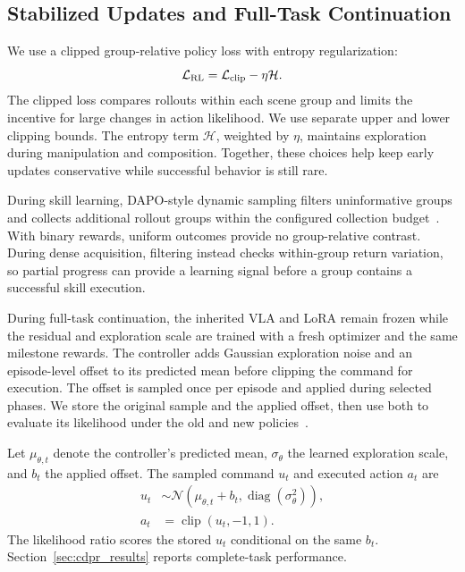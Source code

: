 \subsection{Stabilized Updates and Full-Task Continuation}\label{sec:rl_loss}
We use a clipped group-relative policy loss with entropy regularization:
\begin{equation}
\mathcal L_{\rm RL}=\mathcal L_{\rm clip}-\eta\mathcal H.
\label{eq:rl_loss}
\end{equation}
The clipped loss compares rollouts within each scene group and limits the incentive for large changes in action likelihood. We use separate upper and lower clipping bounds. The entropy term $\mathcal H$, weighted by $\eta$, maintains exploration during manipulation and composition. Together, these choices help keep early updates conservative while successful behavior is still rare.

During skill learning, DAPO-style dynamic sampling filters uninformative groups and collects additional rollout groups within the configured collection budget~\cite{dapo}. With binary rewards, uniform outcomes provide no group-relative contrast. During dense acquisition, filtering instead checks within-group return variation, so partial progress can provide a learning signal before a group contains a successful skill execution.

During full-task continuation, the inherited VLA and LoRA remain frozen while the residual and exploration scale are trained with a fresh optimizer and the same milestone rewards. The controller adds Gaussian exploration noise and an episode-level offset to its predicted mean before clipping the command for execution. The offset is sampled once per episode and applied during selected phases. We store the original sample and the applied offset, then use both to evaluate its likelihood under the old and new policies~\cite{capg}.

Let $\mu_{\theta,t}$ denote the controller's predicted mean, $\sigma_\theta$ the learned exploration scale, and $b_t$ the applied offset. The sampled command $u_t$ and executed action $a_t$ are
\begin{equation}
\begin{aligned}
u_t&\sim\mathcal N(\mu_{\theta,t}+b_t,\operatorname{diag}(\sigma_\theta^2)),\\
a_t&=\operatorname{clip}(u_t,-1,1).
\end{aligned}
\label{eq:latent_action}
\end{equation}
The likelihood ratio scores the stored $u_t$ conditional on the same $b_t$. Section~\ref{sec:cdpr_results} reports complete-task performance.
